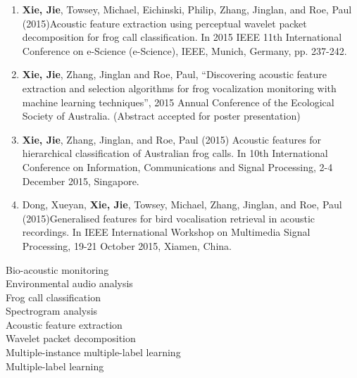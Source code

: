 \begin{enumerate}
\item	\textbf{Xie, Jie}, Towsey, Michael, Eichinski, Philip, Zhang, Jinglan, and Roe, Paul (2015)Acoustic feature extraction using perceptual wavelet packet decomposition for frog call classification. In 2015 IEEE 11th International Conference on e-Science (e-Science), IEEE, Munich, Germany, pp. 237-242.

\item	\textbf{Xie, Jie}, Zhang, Jinglan and Roe, Paul,  “Discovering acoustic feature extraction and selection algorithms for frog vocalization monitoring with machine learning techniques”, 2015 Annual Conference of the Ecological Society of Australia. (Abstract accepted for poster presentation) 

\item	\textbf{Xie, Jie}, Zhang, Jinglan, and Roe, Paul (2015) Acoustic features for hierarchical classification of Australian frog calls. In 10th International Conference on Information, Communications and Signal Processing, 2-4 December 2015, Singapore.

\item	Dong, Xueyan, \textbf{Xie, Jie}, Towsey, Michael, Zhang, Jinglan, and Roe, Paul (2015)Generalised features for bird vocalisation retrieval in acoustic recordings. In IEEE International Workshop on Multimedia Signal Processing, 19-21 October 2015, Xiamen, China.

\end{enumerate} 



\begin{keywords}
Bio-acoustic monitoring \\
Environmental audio analysis \\
Frog call classification \\
Spectrogram analysis \\
Acoustic feature extraction \\
Wavelet packet decomposition \\
Multiple-instance multiple-label learning \\
Multiple-label learning \\
 
\end{keywords}

